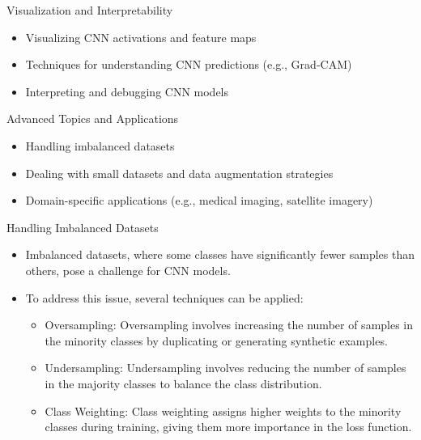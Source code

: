 \documentclass{beamer}
\begin{document}
\begin{frame}{Visualization and Interpretability}
\begin{itemize}
    \item Visualizing CNN activations and feature maps
    \item Techniques for understanding CNN predictions (e.g., Grad-CAM)
    \item Interpreting and debugging CNN models
\end{itemize}
\end{frame}

\begin{frame}{Advanced Topics and Applications}
\begin{itemize}
    \item Handling imbalanced datasets
    \item Dealing with small datasets and data augmentation strategies
    \item Domain-specific applications (e.g., medical imaging, satellite imagery)
\end{itemize}
\end{frame}

\begin{frame}{Handling Imbalanced Datasets}
\begin{itemize}
    \item Imbalanced datasets, where some classes have significantly fewer samples than others, pose a challenge for CNN models.
    \item To address this issue, several techniques can be applied:
        \begin{itemize}
            \item Oversampling: Oversampling involves increasing the number of samples in the minority classes by duplicating or generating synthetic examples.
            \item Undersampling: Undersampling involves reducing the number of samples in the majority classes to balance the class distribution.
            \item Class Weighting: Class weighting assigns higher weights to the minority classes during training, giving them more importance in the loss function.
        \end{itemize}
\end{itemize}
\end{frame}
\end{document}
